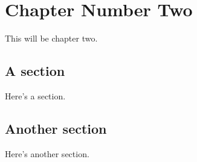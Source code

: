 \chapter{Chapter Number Two}

This will be chapter two.

\section{A section}

Here's a section.

\section{Another section}

Here's another section.


